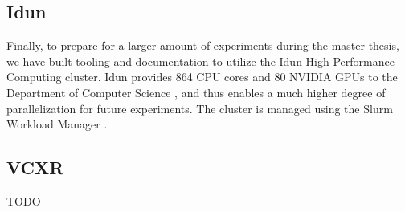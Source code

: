 \subsection{Idun}

Finally,
to prepare for a larger amount of experiments during the master thesis,
we have built tooling and documentation to utilize the Idun High Performance Computing cluster.
Idun provides 864 CPU cores and 80 NVIDIA GPUs to the Department of Computer Science \cite{idun:overview},
and thus enables a much higher degree of parallelization for future experiments.
The cluster is managed using the Slurm Workload Manager \cite{slurm}.


\subsection{VCXR}
TODO
